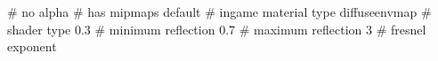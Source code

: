 # no alpha
# has mipmaps
default			 # ingame material type
diffuseenvmap            # shader type
0.3			 # minimum reflection
0.7			 # maximum reflection
3			 # fresnel exponent



